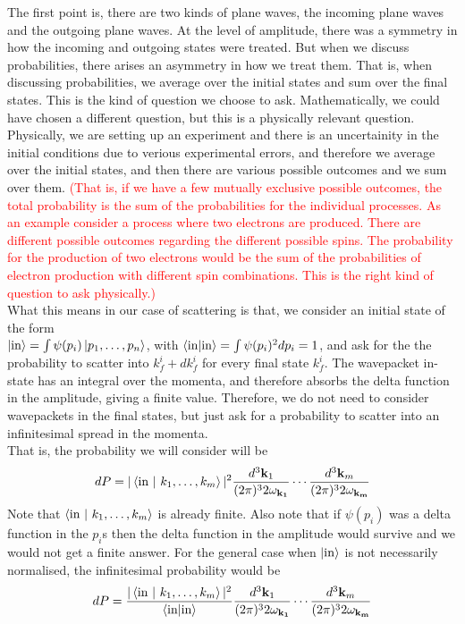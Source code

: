 \documentclass[11pt]{article}
\newcommand{\w}{\omega}
\numberwithin{equation}{section}
\begin{document}
    The first point is, there are two kinds of plane waves, the incoming plane waves and the outgoing plane waves. At the level of amplitude, there was a symmetry in how the incoming and outgoing states were treated. But when we discuss probabilities, there arises an asymmetry in how we treat them. That is, when discussing probabilities, we average over the initial states and sum over the final states. This is the kind of question we choose to ask. Mathematically, we could have chosen a different question, but this is a physically relevant question. Physically, we are setting up an experiment and there is an uncertainity in the initial conditions due to verious experimental errors, and therefore we average over the initial states, and then there are various possible outcomes and we sum over them. \textcolor{red}{(That is, if we have a few mutually exclusive possible outcomes, the total probability is the sum of the probabilities for the individual processes. As an example consider a process where two electrons are produced. There are different possible outcomes regarding the different possible spins. The probability for the production of two electrons would be the sum of the probabilities of electron production with different spin combinations. This is the right kind of question to ask physically.)}\\

    What this means in our case of scattering is that, we consider an initial state of the form \\
    \(\ket{\text{in}} = \int \psi(p_i) \ket{p_1, \ldots, p_n}\), with \(\braket{\text{in}|\text{in}} = \int \psi(p_i)^2 dp_i = 1\), and ask for the the probability to scatter into \(k_f^i + dk_f^i\) for every final state \(k_f^i\). The wavepacket in-state has an integral over the momenta, and therefore absorbs the delta function in the amplitude, giving a finite value. Therefore, we do not need to consider wavepackets in the final states, but just ask for a probability to scatter into an infinitesimal spread in the momenta. \\ 
    That is, the probability we will consider will be 
    \begin{equation*}
        dP = |\braket{\text{in}~| ~k_1, \ldots, k_m}|^2 \frac{d^3\textbf{k}_1}{(2\pi)^3 2\w_\mathbf{k_1}}\cdots \frac{d^3\textbf{k}_m}{(2\pi)^3 2\w_\mathbf{k_m}}
    \end{equation*}
    Note that \(\braket{\text{in}~| ~k_1, \ldots, k_m}\) is already finite. Also note that if \(\psi(p_i)\) was a delta function in the \(p_i\)s then the delta function in the amplitude would survive and we would not get a finite answer. For the general case when \(\ket{\text{in}}\) is not necessarily normalised, the infinitesimal probability would be 
    \begin{equation*}
        dP = \frac{|\braket{\text{in}~| ~k_1, \ldots, k_m}|^2}{\braket{\text{in}|\text{in}}}\frac{d^3\textbf{k}_1}{(2\pi)^3 2\w_\mathbf{k_1}}\cdots \frac{d^3\textbf{k}_m}{(2\pi)^3 2\w_\mathbf{k_m}}
    \end{equation*}
    
\end{document}
